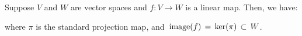 
\vskip 0.5cm
\begin{remark}
\mbox{}
\vskip 0.15cm
\noindent
Suppose $V$ and $W$ are vector spaces and $f : V \longrightarrow W$ is a linear map.
Then, we have:
\begin{center}
\end{center}
where $\pi$ is the standard projection map, and
\,$\textnormal{image}(f) \,=\, \ker(\pi) \,\subset\, W$.
\end{remark}

